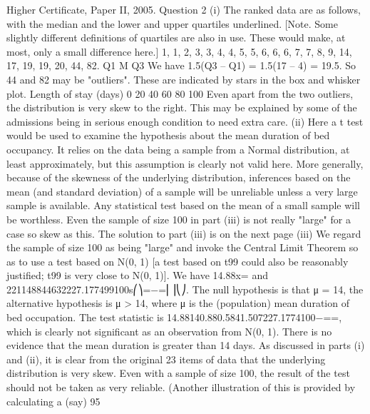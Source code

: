 Higher Certificate, Paper II, 2005. Question 2
(i) The ranked data are as follows, with the median and the lower and upper quartiles underlined. [Note. Some slightly different definitions of quartiles are also in use. These would make, at most, only a small difference here.]
1, 1, 2, 3, 3, 4, 4, 5, 5, 6, 6, 6, 7, 7, 8, 9, 14, 17, 19, 19, 20, 44, 82.
Q1 M Q3
We have 1.5(Q3 – Q1) = 1.5(17 – 4) = 19.5. So 44 and 82 may be "outliers". These are indicated by stars in the box and whisker plot.
Length of
stay (days)
0
20
40
60
80
100
Even apart from the two outliers, the distribution is very skew to the right. This may be explained by some of the admissions being in serious enough condition to need extra care.
(ii) Here a t test would be used to examine the hypothesis about the mean duration of bed occupancy. It relies on the data being a sample from a Normal distribution, at least approximately, but this assumption is clearly not valid here. More generally, because of the skewness of the underlying distribution, inferences based on the mean (and standard deviation) of a sample will be unreliable unless a very large sample is available. Any statistical test based on the mean of a small sample will be worthless. Even the sample of size 100 in part (iii) is not really "large" for a case so skew as this.
The solution to part (iii) is on the next page
(iii) We regard the sample of size 100 as being "large" and invoke the Central Limit Theorem so as to use a test based on N(0, 1) [a test based on t99 could also be reasonably justified; t99 is very close to N(0, 1)].
We have 14.88x= and 221148844632227.177499100s⎛⎞=−=⎜⎟⎝⎠.
The null hypothesis is that μ = 14, the alternative hypothesis is μ > 14, where μ is the (population) mean duration of bed occupation.
The test statistic is 14.88140.880.5841.507227.1774100−==, which is clearly not significant as an observation from N(0, 1). There is no evidence that the mean duration is greater than 14 days.
As discussed in parts (i) and (ii), it is clear from the original 23 items of data that the underlying distribution is very skew. Even with a sample of size 100, the result of the test should not be taken as very reliable. (Another illustration of this is provided by calculating a (say) 95%
